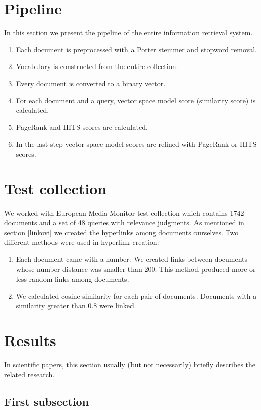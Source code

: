\documentclass[10pt, a4paper]{article}
\begin{document}
\section{Pipeline}
In this section we present the pipeline of the entire information retrieval system.

\begin{enumerate}
\item Each document is preprocessed with a Porter stemmer and stopword removal.
\item Vocabulary is constructed from the entire collection.
\item Every document is converted to a binary vector.
\item For each document and a query, vector space model score (similarity score) is calculated.
\item PageRank and HITS scores are calculated.
\item In the last step vector space model scores are refined with PageRank or HITS scores.
\end{enumerate}


\section{Test collection}
We worked with European Media Monitor test collection which contains 1742 documents and a set of 48 queries with relevance judgments. As mentioned in section \ref{linkovi} we created the hyperlinks among documents ourselves. Two different methods were used in hyperlink creation:
\begin{enumerate}
\item Each document came with a number. We created links between documents whose number distance was smaller than 200. This method produced more or less random links among documents.
\item We calculated cosine similarity for each pair of documents. Documents with a similarity greater than 0.8 were linked.
\end{enumerate}

\section{Results}

In scientific papers, this section usually (but not necessarily) briefly describes the related research. 

\subsection{First subsection}
\label{sec:first}
\end{document}
